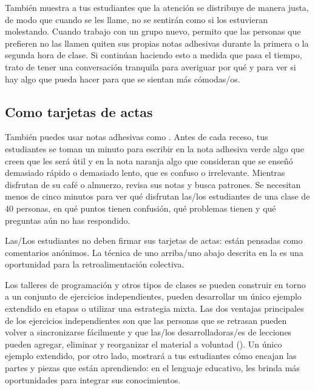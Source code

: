 También muestra a tus estudiantes que la atención se distribuye de manera justa,
de modo que cuando se les llame,
no se sentirán como si los estuvieran molestando.
Cuando trabajo con un grupo nuevo,
permito que las personas que prefieren no las llamen quiten sus propias notas adhesivas
durante la primera o la segunda hora de clase.
Si continúan haciendo esto a medida que pasa el tiempo,
trato de tener una conversación tranquila para averiguar por qué
y para ver si hay algo que pueda hacer para que se sientan más cómodas/os.

\subsection*{Como tarjetas de actas}

También puedes usar notas adhesivas como .
Antes de cada receso,
tus estudiantes se toman un minuto para escribir en la nota adhesiva verde
algo que creen que les será útil
y en la nota naranja
algo que consideran que se enseñó demasiado rápido o demasiado lento,
que es confuso
o irrelevante.
Mientras disfrutan de su café o almuerzo,
revisa sus notas y busca patrones.
Se necesitan menos de cinco minutos para ver qué disfrutan las/los estudiantes de una clase de 40 personas,
en qué puntos tienen confusión,
qué problemas tienen
y qué preguntas aún no has respondido.

Las/Los estudiantes no deben firmar sus tarjetas de actas:
están pensadas como comentarios anónimos.
La técnica de uno arriba/uno abajo descrita en la 
es una oportunidad para la retroalimentación colectiva.


Los talleres de programación y otros tipos de clases
se pueden construir en torno a un conjunto de ejercicios independientes,
pueden desarrollar un único ejemplo extendido en etapas
o utilizar una estrategia mixta.
Las dos ventajas principales de los ejercicios independientes son que
las personas que se retrasan pueden volver a sincronizarse fácilmente
y que las/los desarrolladoras/es de lecciones pueden agregar, eliminar y reorganizar el material a voluntad
().
Un único ejemplo extendido,
por otro lado,
mostrará a tus estudiantes cómo encajan las partes y piezas que están aprendiendo:
en el lenguaje educativo,
les brinda más oportunidades para integrar sus conocimientos.


